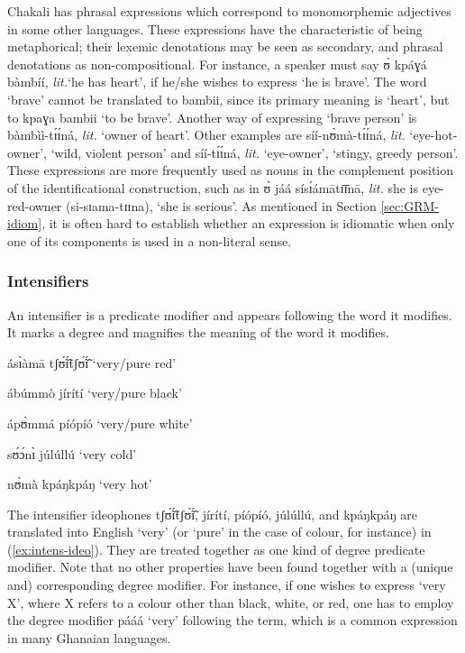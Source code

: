 \begin{exe}
\begin{exe}
\begin{exe}
\begin{exe}
\begin{exe}
\begin{exe}
\begin{exe}
\begin{exe}
\begin{exe}
Chakali has phrasal expressions which correspond to  monomorphemic adjectives in some other languages. These expressions have the characteristic of being metaphorical; their lexemic denotations may be seen as secondary, and phrasal  denotations as non-compositional. For instance, a speaker must say {\sls ʊ̀ kpáɣá bàmbíí}, {\it lit.}`he has heart', if he/she wishes to express `he is brave'. The word `brave' cannot be translated to {\sls bambii}, since its primary meaning is `heart',  but to {\sls kpaɣa bambii}  `to be brave'. Another way of expressing `brave person'  is {\sls bàmbìì-tɪ́ɪ́ná}, {\it lit.} `owner of heart'. Other examples  are {\sls síí-nʊ̀mà-tɪ́ɪ́ná}, {\it lit.} `eye-hot-owner', `wild, violent  person'   and {\sls síí-tɪ́ɪ́ná}, {\it lit.} `eye-owner', `stingy, greedy person'. These expressions are more frequently used as nouns in the complement position of the identificational construction, such as in {\sls ʊ̀ jáá sísɪ́ámātɪ̄ɪ̄nā}, {\it lit.} she is eye-red-owner  ({\sls si-sɪama-tɪɪna}), `she is serious'. As mentioned in Section \ref{sec:GRM-idiom},  it is often hard to establish whether an expression is idiomatic when only one of its components is used in a non-literal sense.



\subsubsection{Intensifiers}
\label{sec:GRM-intensifier}

An intensifier is a predicate modifier and appears following the word it modifies. It marks a degree and magnifies the meaning of the word it modifies.

\ea\label{ex:intens-ideo} 
\ea  ásɪ̀àmā tʃʊ̃́ɪ̃́tʃʊ̃́ɪ̃́   {\rm `very/pure  red'}
\label{ex:BCTmod-prop-red}

\ex ábúmmò jírítí {\rm `very/pure black'}
\label{ex:BCTmod-prop-black} 

\ex  ápʊ̀mmá píópíó  {\rm `very/pure  white'}
\label{ex:BCTmod-prop-white}

\ex  sʊ́ɔ́nɪ̀ júlúllú  {\rm `very cold'}
\label{ex:BCTmod-prop-cold}

\ex   nʊ̀mà kpáŋkpáŋ  {\rm `very hot'}
\label{ex:BCTmod-prop-hot}


\z
\z


The  intensifier ideophones  {\sls tʃʊ̃́ɪ̃́tʃʊ̃́ɪ̃́},  {\sls jírítí},  {\sls píópíó},  {\sls júlúllú},  and {\sls kpáŋkpáŋ} are translated into English  `very' (or `pure' in the case of colour, for instance) in (\ref{ex:intens-ideo}). They are treated together as one kind of degree predicate modifier.  Note that no other properties have been found together with a (unique and) corresponding degree modifier. For instance, if one wishes to express `very X', where X refers to a colour other than black, white, or red,   one has to employ the degree modifier {\sls pááá} `very' following the term, which is a common expression in many Ghanaian languages. 


\end{exe}
\end{exe}
\end{exe}
\end{exe}
\end{exe}
\end{exe}
\end{exe}
\end{exe}
\end{exe}
